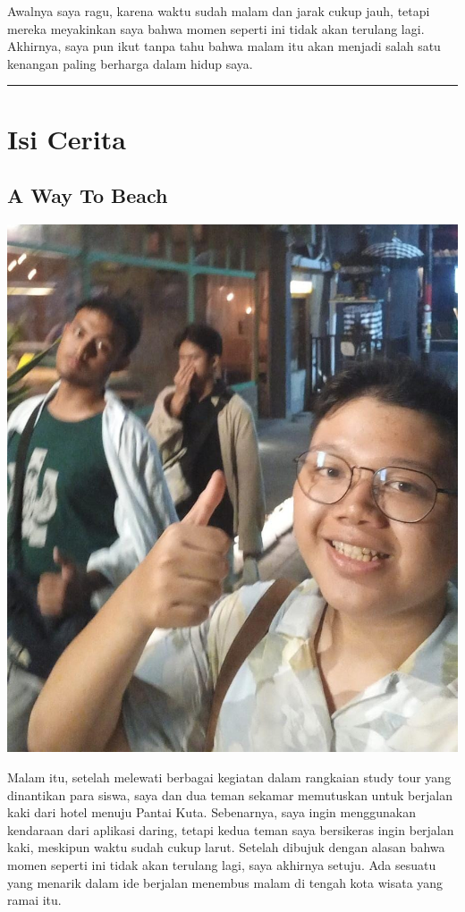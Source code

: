 \documentclass[
  letterpaper,
  DIV=11,
  numbers=noendperiod]{scrreprt}
\begin{document}
Awalnya saya ragu, karena waktu sudah malam dan jarak cukup jauh, tetapi
mereka meyakinkan saya bahwa momen seperti ini tidak akan terulang
lagi.\\
Akhirnya, saya pun ikut tanpa tahu bahwa malam itu akan menjadi salah
satu kenangan paling berharga dalam hidup saya.

\begin{center}\rule{0.5\linewidth}{0.5pt}\end{center}

\section{Isi Cerita}\label{isi-cerita}

\subsection*{A Way To Beach}\label{a-way-to-beach}

\begin{center}
\includegraphics[width=0.6\linewidth,height=\textheight,keepaspectratio]{My_Stories_for_You/../images/myFriends.jpg}
\end{center}

Malam itu, setelah melewati berbagai kegiatan dalam rangkaian study tour
yang dinantikan para siswa, saya dan dua teman sekamar memutuskan untuk
berjalan kaki dari hotel menuju Pantai Kuta. Sebenarnya, saya ingin
menggunakan kendaraan dari aplikasi daring, tetapi kedua teman saya
bersikeras ingin berjalan kaki, meskipun waktu sudah cukup larut.
Setelah dibujuk dengan alasan bahwa momen seperti ini tidak akan
terulang lagi, saya akhirnya setuju. Ada sesuatu yang menarik dalam ide
berjalan menembus malam di tengah kota wisata yang ramai itu.
\end{document}
